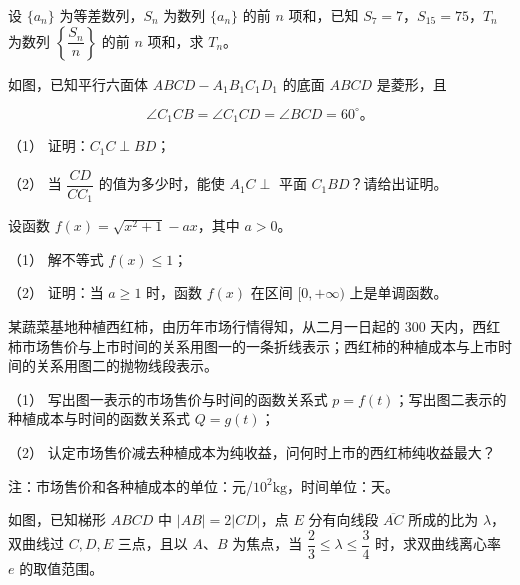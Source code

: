 \begin{question}
设 $\{a_n\}$ 为等差数列，$S_n$ 为数列 $\{a_n\}$ 的前 $n$ 项和，已知 $S_7=7$，$S_{15}=75$，$T_n$ 为数列 $\left\{\dfrac{S_n}{n}\right\}$ 的前 $n$ 项和，求 $T_n$。

\Needspace{0.4\textheight}
\end{question}
\begin{question}
如图，已知平行六面体 $ABCD-A_1B_1C_1D_1$ 的底面 $ABCD$ 是菱形，且

\nopagebreak[4]
\[
\angle C_1CB=\angle C_1CD=\angle BCD=60^\circ。
\]

（1） 证明：$C_1C\perp BD$；

（2） 当 $\dfrac{CD}{CC_1}$ 的值为多少时，能使 $A_1C\perp$ 平面 $C_1BD$？请给出证明。
\nopagebreak[4]
\begin{center}\end{center}
\nopagebreak[4]
\end{question}
\begin{question}
设函数 $f(x)=\sqrt{x^2+1}-ax$，其中 $a>0$。

（1） 解不等式 $f(x)\le1$；

（2） 证明：当 $a\ge1$ 时，函数 $f(x)$ 在区间 $[0,+\infty)$ 上是单调函数。

\Needspace{0.4\textheight}
\end{question}
\begin{question}
某蔬菜基地种植西红柿，由历年市场行情得知，从二月一日起的 300 天内，西红柿市场售价与上市时间的关系用图一的一条折线表示；西红柿的种植成本与上市时间的关系用图二的抛物线段表示。

（1） 写出图一表示的市场售价与时间的函数关系式 $p=f(t)$；写出图二表示的种植成本与时间的函数关系式 $Q=g(t)$；

（2） 认定市场售价减去种植成本为纯收益，问何时上市的西红柿纯收益最大？

注：市场售价和各种植成本的单位：元/$10^2\mathrm{kg}$，时间单位：天。
\nopagebreak[4]
\begin{center}\end{center}
\nopagebreak[4]
\Needspace{0.4\textheight}
\end{question}
\begin{question}
如图，已知梯形 $ABCD$ 中 $|AB|=2|CD|$，点 $E$ 分有向线段 $\overline{AC}$ 所成的比为 $\lambda$，双曲线过 $C,D,E$ 三点，且以 $A\text{、}B$ 为焦点，当 $\dfrac23\le\lambda\le\dfrac34$ 时，求双曲线离心率 $e$ 的取值范围。
\nopagebreak[4]
\begin{center}\end{center}
\nopagebreak[4]

\end{question}